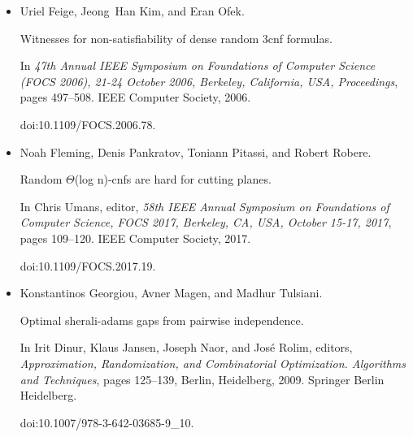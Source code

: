 \documentclass[10pt,a4paper]{article}
\begin{document}
\begin{itemize}
Uriel Feige.


Relations between average case complexity and approximation
complexity.


In \emph{Proceedings of the 17th Annual IEEE Conference on
Computational Complexity, Montréal, Québec, Canada, May 21-24,
2002}, page 5. IEEE Computer Society, 2002.


doi:10.1109/CCC.2002.10006.





\item[] 
[19]

Uriel Feige, Jeong Han Kim, and Eran Ofek.


Witnesses for non-satisfiability of dense random 3cnf formulas.


In \emph{47th Annual IEEE Symposium on Foundations of Computer
Science (FOCS 2006), 21-24 October 2006, Berkeley, California, USA,
Proceedings}, pages 497–508. IEEE Computer Society,
2006.


doi:10.1109/FOCS.2006.78.





\item[] 
[20]

Noah Fleming, Denis Pankratov, Toniann Pitassi, and Robert Robere.


Random $\Theta$(log n)-cnfs are hard for cutting planes.


In Chris Umans, editor, \emph{58th IEEE Annual Symposium on
Foundations of Computer Science, FOCS 2017, Berkeley, CA, USA, October
15-17, 2017}, pages 109–120. IEEE Computer Society, 2017.


doi:10.1109/FOCS.2017.19.





\item[] 
[21]

Konstantinos Georgiou, Avner Magen, and Madhur Tulsiani.


Optimal sherali-adams gaps from pairwise independence.


In Irit Dinur, Klaus Jansen, Joseph Naor, and José Rolim,
editors, \emph{Approximation, Randomization, and Combinatorial Optimization.
Algorithms and Techniques}, pages 125–139, Berlin, Heidelberg, 2009.
Springer Berlin Heidelberg.


doi:10.1007/978-3-642-03685-9\_10.






\end{itemize}
\end{document}

